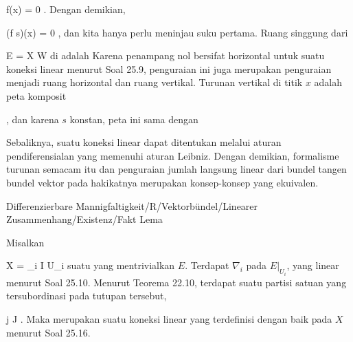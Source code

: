 {\mavergleichskette
{\vergleichskette
{ f(x)
}
{ = }{ 0
}
{  }{
}
{    }{
}
{   }{
}
}
{}{}{}.
Dengan demikian,

\mavergleichskette
{\vergleichskette
{ (f \nabla s)(x)
}
{ = }{ 0
}
{  }{
}
{    }{
}
{   }{
}
}
{}{}{,}
dan kita hanya perlu meninjau suku pertama. Ruang singgung dari

\mavergleichskette
{\vergleichskette
{ E
}
{ = }{ X \times W
}
{  }{
}
{    }{
}
{   }{
}
}
{}{}{}
di
 adalah
Karena penampang nol bersifat horizontal untuk suatu koneksi linear menurut
Soal 25.9,
penguraian ini juga merupakan penguraian menjadi ruang horizontal dan ruang vertikal. Turunan vertikal
 di titik $x$ adalah peta komposit

 { , }
dan karena $s$ konstan, peta ini sama dengan

}

Sebaliknya, suatu koneksi linear dapat ditentukan melalui aturan pendiferensialan yang memenuhi aturan Leibniz. Dengan demikian, formalisme turunan semacam itu dan penguraian jumlah langsung linear dari bundel tangen bundel vektor pada hakikatnya merupakan konsep-konsep yang ekuivalen.



{Differenzierbare Mannigfaltigkeit/R/Vektorbündel/Linearer Zusammenhang/Existenz/Fakt}
{Lema}
{}
{

\faktzusatz {}
\faktzusatz {}

}
{

Misalkan

\mavergleichskette
{\vergleichskette
{ X
}
{ = }{ \bigcup_{i \in I} U_i
}
{  }{
}
{    }{
}
{   }{
}
}
{}{}{}
suatu
yang mentrivialkan $E$. Terdapat
$\nabla_i$ pada $E\vert_{U_i }$, yang linear menurut
Soal 25.10.
Menurut
Teorema 22.10,
terdapat suatu partisi satuan yang tersubordinasi pada tutupan tersebut,

 {}
 {j \in J} {}
 {} {} {} {.}
Maka
 merupakan suatu koneksi linear yang terdefinisi dengan baik pada $X$ menurut
Soal 25.16.

}

